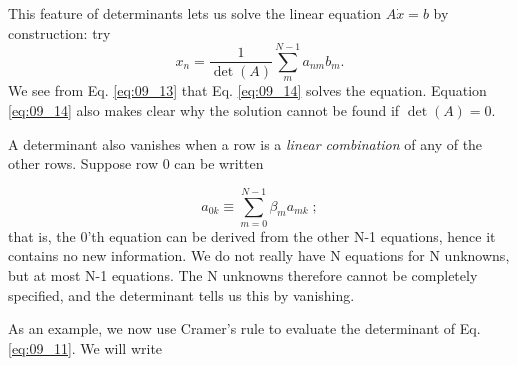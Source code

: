 This feature of determinants lets us solve the linear equation
$A \dot x = b$ by construction: try
\begin{equation}
	x_n=\frac{1}{\det(A)}\sum_{m}^{N-1}a_{nm}b_m.\label{eq:09_14}
\end{equation}
We see from Eq. \ref{eq:09_13} that Eq. \ref{eq:09_14} solves the equation. Equation \ref{eq:09_14}
also makes clear why the solution cannot be found if $\det(A) = 0$.

A determinant also vanishes when a row is a \textit{linear combination}
of any of the other rows. Suppose row 0 can be written

\begin{equation}
	a_{0k}\equiv	\sum_{m=0}^{N-1}\beta _m a_{mk}\;;\nonumber
\end{equation}
that is, the 0'th equation can be derived from the other N-1
equations, hence it contains no new information. We do not really
have N equations for N unknowns, but at most N-1 equations. The
N unknowns therefore cannot be completely specified, and the
determinant tells us this by vanishing.

As an example, we now use Cramer's rule to evaluate the determinant of Eq. \ref{eq:09_11}. We will write


